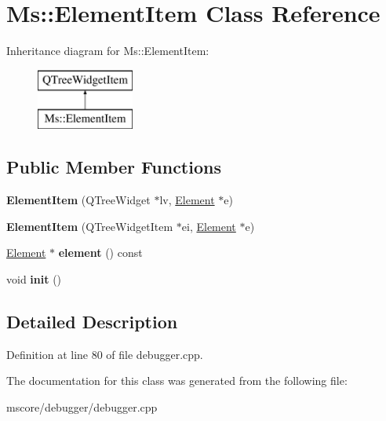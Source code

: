 \hypertarget{class_ms_1_1_element_item}{}\section{Ms\+:\+:Element\+Item Class Reference}
\label{class_ms_1_1_element_item}
Inheritance diagram for Ms\+:\+:Element\+Item\+:\begin{figure}[H]
\begin{center}
\leavevmode
\includegraphics[height=2.000000cm]{class_ms_1_1_element_item}
\end{center}
\end{figure}
\subsection*{Public Member Functions}
\begin{DoxyCompactItemize}
\item 
\mbox{\label{class_ms_1_1_element_item_a88a982ba1079751181597bc18c10d28e}} 
{\bfseries Element\+Item} (Q\+Tree\+Widget $\ast$lv, \hyperlink{class_ms_1_1_element}{Element} $\ast$e)
\item 
\mbox{\label{class_ms_1_1_element_item_a863b6a39d0f5106889b5952c50029a82}} 
{\bfseries Element\+Item} (Q\+Tree\+Widget\+Item $\ast$ei, \hyperlink{class_ms_1_1_element}{Element} $\ast$e)
\item 
\mbox{\label{class_ms_1_1_element_item_a4b326f1a90a5b93f8f9b4b451eac3c72}} 
\hyperlink{class_ms_1_1_element}{Element} $\ast$ {\bfseries element} () const
\item 
\mbox{\label{class_ms_1_1_element_item_aaecdec7f542ebf82cb7e6ef792643e65}} 
void {\bfseries init} ()
\end{DoxyCompactItemize}


\subsection{Detailed Description}


Definition at line 80 of file debugger.\+cpp.



The documentation for this class was generated from the following file\+:\begin{DoxyCompactItemize}
\item 
mscore/debugger/debugger.\+cpp\end{DoxyCompactItemize}
